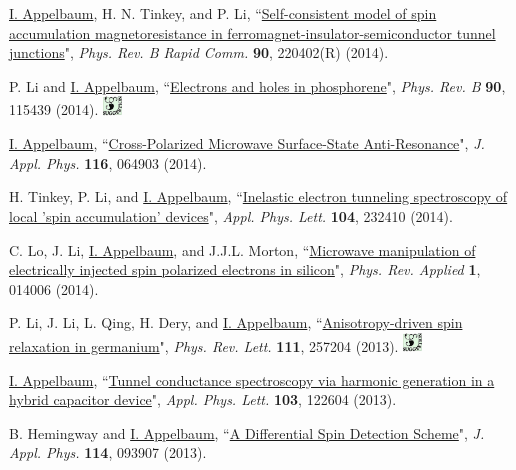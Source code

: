 \documentclass[paper=letter,fontsize=11pt]{scrartcl} %
\newcommand{\PaperEntry}[7]{
		\noindent #1, ``\href{#7}{#2}", \textit{#3} \textbf{#4}, #5 (#6).}
\begin{document}
\begin{etaremune}
\item \PaperEntry{\underline{I. Appelbaum}, H. N. Tinkey, and P. Li}{Self-consistent model of spin accumulation magnetoresistance in ferromagnet-insulator-semiconductor tunnel junctions}{Phys. Rev. B Rapid Comm.}{90}{220402(R)}{2014}
{http://dx.doi.org/10.1103/PhysRevB.90.220402}

\item \PaperEntry{P. Li and \underline{I. Appelbaum}}{Electrons and holes in phosphorene}{Phys. Rev. B}{90}{115439}{2014}
{http://dx.doi.org/10.1103/PhysRevB.90.115439} \includegraphics[width=0.2in]{sug.pdf} 

\item \PaperEntry{\underline{I. Appelbaum}}{Cross-Polarized Microwave Surface-State Anti-Resonance}{J. Appl. Phys.}{116}{064903}{2014}{http://dx.doi.org/10.1063/1.4892867}

\item \PaperEntry{H. Tinkey, P. Li, and \underline{I. Appelbaum}}{Inelastic electron tunneling spectroscopy of local 'spin accumulation' devices}{Appl. Phys. Lett.}{104}{232410}{2014}{http://dx.doi.org/10.1063/1.4883638}

\item \PaperEntry{C. Lo, J. Li, \underline{I. Appelbaum}, and J.J.L. Morton}{Microwave manipulation of electrically injected spin polarized electrons in silicon}{Phys. Rev. Applied}{1}{014006}{2014}{http://dx.doi.org/10.1103/PhysRevApplied.1.014006}

\item\PaperEntry
{P. Li, J. Li, L. Qing, H. Dery, and \underline{I. Appelbaum}}{Anisotropy-driven spin relaxation in germanium}{Phys. Rev. Lett.}{111}{257204}{2013}{http://dx.doi.org/10.1103/PhysRevLett.111.257204} \includegraphics[width=0.2in]{sug.pdf} 

\item\PaperEntry
{\underline{I. Appelbaum}}{Tunnel conductance spectroscopy via harmonic generation in a hybrid capacitor device}{Appl. Phys. Lett.}{103}{122604}{2013}{http://dx.doi.org/10.1063/1.4821748}

\item\PaperEntry{B. Hemingway and \underline{I. Appelbaum}}{A Differential Spin Detection Scheme}{J. Appl. Phys.}{114}{093907}{2013}{http://dx.doi.org/10.1063/1.4820467}


\end{etaremune}
\end{document}
